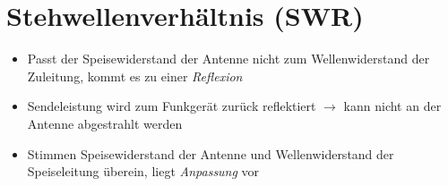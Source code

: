 
\section{Stehwellenverhältnis (SWR)}
\label{section:swr}
\begin{frame}%
\begin{itemize}
  \item Passt der Speisewiderstand der Antenne nicht zum Wellenwiderstand der Zuleitung, kommt es zu einer \emph{Reflexion}
  \item Sendeleistung wird zum Funkgerät zurück reflektiert $\rightarrow$ kann nicht an der Antenne abgestrahlt werden
  \item Stimmen Speisewiderstand der Antenne und Wellenwiderstand der Speiseleitung überein, liegt \emph{Anpassung} vor
  \end{itemize}
\end{frame}

